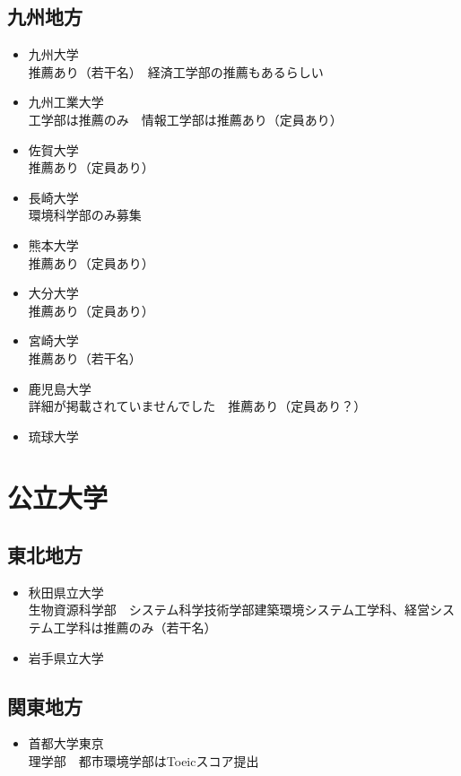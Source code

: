 \documentclass[platex, dvipdfmx, a4paper]{jarticle}
\begin{document}
      \subsection{九州地方}
        \begin{itemize}
          \item 九州大学
            \\推薦あり（若干名）　経済工学部の推薦もあるらしい
          \item 九州工業大学
            \\工学部は推薦のみ　情報工学部は推薦あり（定員あり）
          \item 佐賀大学
            \\推薦あり（定員あり）　
          \item 長崎大学
            \\環境科学部のみ募集
          \item 熊本大学
            \\推薦あり（定員あり）
          \item 大分大学
            \\推薦あり（定員あり）
          \item 宮崎大学
            \\推薦あり（若干名）
          \item 鹿児島大学
            \\詳細が掲載されていませんでした　推薦あり（定員あり？）
          \item 琉球大学
        \end{itemize}
    \section{公立大学}
      \subsection{東北地方}
      \begin{itemize}
        \item 秋田県立大学
          \\生物資源科学部　システム科学技術学部建築環境システム工学科、経営システム工学科は推薦のみ（若干名）
        \item 岩手県立大学
      \end{itemize}
      \subsection{関東地方}
        \begin{itemize}
          \item 首都大学東京
            \\理学部　都市環境学部はToeicスコア提出
        \end{itemize}
\end{document}
